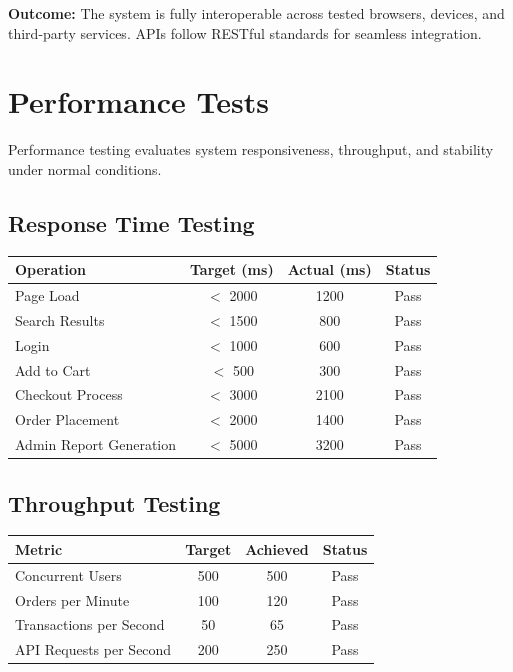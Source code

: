 \documentclass[12pt,a4paper]{report}
\begin{document}
\textbf{Outcome:} The system is fully interoperable across tested browsers, devices, and third-party services. APIs follow RESTful standards for seamless integration.

\section{Performance Tests}
Performance testing evaluates system responsiveness, throughput, and stability under normal conditions.

\subsection{Response Time Testing}

\begin{longtable}{|p{4cm}|c|c|c|}
\hline
\textbf{Operation} & \textbf{Target (ms)} & \textbf{Actual (ms)} & \textbf{Status} \\
\hline
\endfirsthead
Page Load & $<$ 2000 & 1200 & Pass \\
\hline
Search Results & $<$ 1500 & 800 & Pass \\
\hline
Login & $<$ 1000 & 600 & Pass \\
\hline
Add to Cart & $<$ 500 & 300 & Pass \\
\hline
Checkout Process & $<$ 3000 & 2100 & Pass \\
\hline
Order Placement & $<$ 2000 & 1400 & Pass \\
\hline
Admin Report Generation & $<$ 5000 & 3200 & Pass \\
\hline
\end{longtable}

\subsection{Throughput Testing}

\begin{longtable}{|p{4cm}|c|c|c|}
\hline
\textbf{Metric} & \textbf{Target} & \textbf{Achieved} & \textbf{Status} \\
\hline
\endfirsthead
Concurrent Users & 500 & 500 & Pass \\
\hline
Orders per Minute & 100 & 120 & Pass \\
\hline
Transactions per Second & 50 & 65 & Pass \\
\hline
API Requests per Second & 200 & 250 & Pass \\
\hline
\end{longtable}
\end{document}
